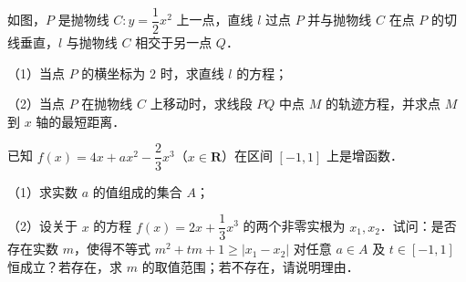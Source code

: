 \begin{question}
如图，$P$ 是抛物线 $C: y = \dfrac{1}{2}x^2$ 上一点，直线 $l$ 过点 $P$ 并与抛物线 $C$ 在点 $P$ 的切线垂直，$l$ 与抛物线 $C$ 相交于另一点 $Q$．

（1）当点 $P$ 的横坐标为 $2$ 时，求直线 $l$ 的方程；

（2）当点 $P$ 在抛物线 $C$ 上移动时，求线段 $PQ$ 中点 $M$ 的轨迹方程，并求点 $M$ 到 $x$ 轴的最短距离．
\nopagebreak[4]
\begin{center}\end{center}
\nopagebreak[4]
\end{question}
\begin{question}
已知 $f(x) = 4x + ax^2 - \dfrac{2}{3}x^3$（$x \in \mathbf{R}$）在区间 $[-1, 1]$ 上是增函数．

（1）求实数 $a$ 的值组成的集合 $A$；

（2）设关于 $x$ 的方程 $f(x) = 2x + \dfrac{1}{3}x^3$ 的两个非零实根为 $x_1, x_2$．试问：是否存在实数 $m$，使得不等式 $m^2 + tm + 1 \geqslant |x_1 - x_2|$ 对任意 $a \in A$ 及 $t \in [-1, 1]$ 恒成立？若存在，求 $m$ 的取值范围；若不存在，请说明理由．

\end{question}